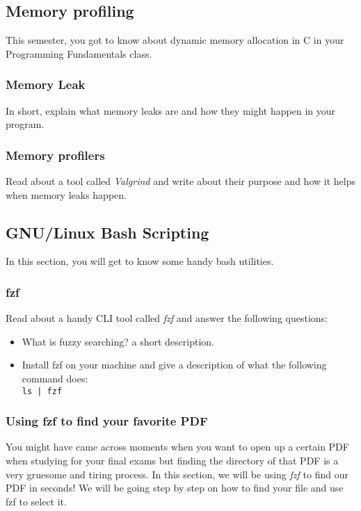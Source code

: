 \documentclass[12pt]{article}
\begin{document}
\subsection{Memory profiling}
This semester, you got to know about dynamic memory allocation in C in your Programming Fundamentals class.

\subsubsection{Memory Leak}
In short, explain what memory leaks are and how they might happen in your program.

\subsubsection{Memory profilers}
Read about a tool called \textit{Valgrind} and write about their purpose and how it helps when memory leaks happen.

\subsection{GNU/Linux Bash Scripting}
In this section, you will get to know some handy bash utilities.

\subsubsection{fzf}
Read about a handy CLI tool called \textit{fzf} and answer the following questions:

\begin{itemize}
    \item What is fuzzy searching? a short description.
    \item Install fzf on your machine and give a description of what the following command does:\\
        \texttt{ls | fzf}
\end{itemize}

\subsubsection{Using fzf to find your favorite PDF}
You might have came across moments when you want to open up a certain PDF when studying for your final exams but finding the directory of that
PDF is a very gruesome and tiring process. In this section, we will be using \textit{fzf} to find our PDF in seconds! We will be going step by step
on how to find your file and use fzf to select it.
\end{document}

